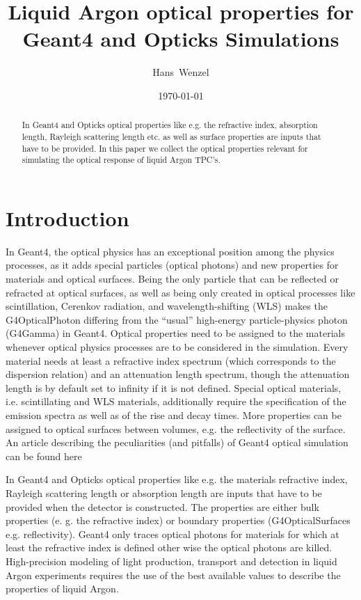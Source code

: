 \documentclass{article}
\title{Liquid Argon optical properties for Geant4 and Opticks Simulations}
\date{\today}
\author{ Hans~Wenzel}
\affil[$^1$ ~Fermilab PO Box 500, Batavia, IL 60510,USA]
\begin{document}
\maketitle

\begin{abstract}
  In Geant4 and Opticks optical properties like e.g. the refractive
  index, absorption length, Rayleigh scattering length etc. as well as surface properties are inputs that have to be provided.
  In this paper we collect the
  optical properties relevant for  simulating the optical response of liquid Argon TPC's.   
\end{abstract}
\clearpage 
\tableofcontents
\clearpage
\section{Introduction}

In Geant4, the optical physics has an exceptional position among the physics processes, as it
adds special particles (optical photons) and new properties for materials and optical surfaces.
Being the only particle that can be reflected or refracted at optical surfaces, as well as being
only created in optical processes like scintillation, Cerenkov radiation, and wavelength-shifting
(WLS) makes the G4OpticalPhoton differing from the “usual” high-energy particle-physics
photon (G4Gamma) in Geant4. Optical properties need to be assigned to the materials whenever
optical physics processes are to be considered in the simulation. Every material needs at least
a refractive index spectrum (which corresponds to the dispersion relation) and an attenuation
length spectrum, though the attenuation length is by default set to infinity if it is not defined.
Special optical materials, i.e. scintillating and WLS materials, additionally require the specification
of the emission spectra as well as of the rise and decay times. More properties can be
assigned to optical surfaces between volumes, e.g. the reflectivity of the surface.
An article describing the peculiarities (and pitfalls) of Geant4 optical simulation can be found here \cite{ref:peculiar}
  
  In Geant4 \cite{ref:geant4} and Opticks \cite{ref:opticks} optical properties like e.g. the materials refractive
  index, Rayleigh scattering length or absorption length are inputs that have to be provided when the detector is constructed.  The properties are either bulk properties (e. g.  the refractive
  index) or boundary properties (G4OpticalSurfaces e.g. reflectivity). Geant4 only traces optical photons for materials for which at least the refractive index is defined other wise the optical photons are killed.
  High-precision modeling of 
  light production, transport and detection in liquid Argon  experiments requires the use of the best available values to describe the properties of liquid Argon.
 
\end{document}
